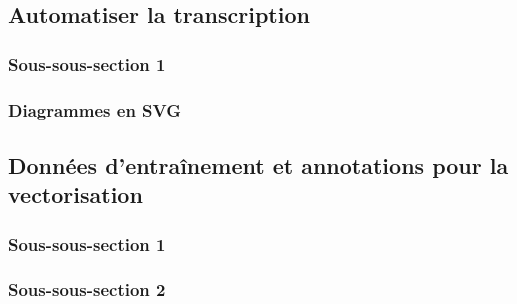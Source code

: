 
\subsection{Automatiser la transcription}
    \subsubsection{Sous-sous-section 1}

    
    \subsubsection{Diagrammes en SVG}

    
    \subsection{Données d’entraînement et annotations pour la vectorisation}
        \subsubsection{Sous-sous-section 1}


        \subsubsection{Sous-sous-section 2}


